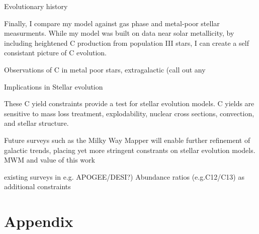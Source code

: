 \documentclass[12pt,oneside]{report}
\begin{document}
Evolutionary history

Finally, I compare my model against gas phase and metal-poor stellar measurments. While my model was built on data near solar metallicity, by including heightened C production from population III stars, I can create a self consistant picture of C evolution.

Observations of C in metal poor stars, extragalactic (call out any

Implications in Stellar evolution

These C yield constraints provide a test for stellar evolution models. C yields are sensitive to mass loss treatment, explodability, nuclear cross sections, convection, and stellar structure. 

Future surveys such as the Milky Way Mapper will enable further refinement of galactic trends, placing yet more stringent constrants on stellar evolution models.
MWM and value of this work

existing surveys in e.g. APOGEE/DESI?)
Abundance ratios (e.g.C12/C13) as additional constraints





\newpage






\appendix
\chapter*{Appendix}
\renewcommand{\thesection}{A.\arabic{section}}
\renewcommand\thefigure{A\arabic{figure}}    
\renewcommand\theequation{A\arabic{equation}}    
\setcounter{figure}{0}
\setcounter{equation}{0}
\end{document}
